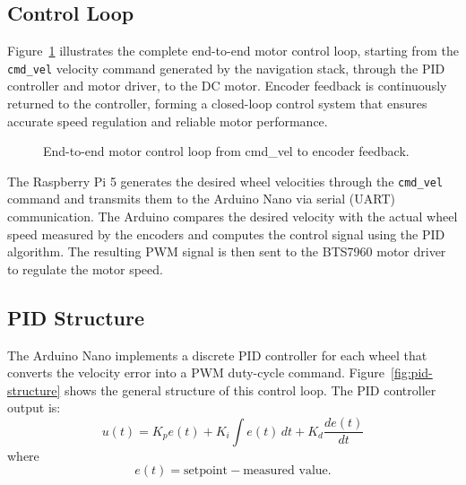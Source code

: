\subsection*{Control Loop}
Figure~\ref{fig:control-loop} illustrates the complete end-to-end motor control loop, starting from the \texttt{cmd\_vel} velocity command generated by the navigation stack, through the PID controller and motor driver, to the DC motor. Encoder feedback is continuously returned to the controller, forming a closed-loop control system that ensures accurate speed regulation and reliable motor performance.

\begin{figure}[H]
\centering
{}
\caption{End-to-end motor control loop from cmd\_vel to encoder feedback.}
\label{fig:control-loop}
\end{figure}
The Raspberry Pi 5 generates the desired wheel velocities through the \texttt{cmd\_vel} command and transmits them to the Arduino Nano via serial (UART) communication. The Arduino compares the desired velocity with the actual wheel speed measured by the encoders and computes the control signal using the PID algorithm. The resulting PWM signal is then sent to the BTS7960 motor driver to regulate the motor speed.


\subsection*{PID Structure}
The Arduino Nano implements a discrete PID controller for each wheel that converts the velocity error into a PWM duty-cycle command. Figure~\ref{fig:pid-structure} shows the general structure of this control loop. The PID controller output is:
\[
u(t) = K_p e(t) + K_i \int e(t)\,dt + K_d \frac{d e(t)}{dt}
\]
where
\[
e(t) = \text{setpoint} - \text{measured value}.
\]

